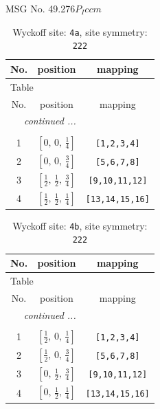 \documentclass[fleqn,8pt]{jsarticle}
\begin{document}
\setcounter{MaxMatrixCols}{32}

\renewcommand{\tablename}{Table~}
\renewcommand{\figurename}{Figure~}
\begin{center}
\LARGE
MSG No. 49.276\quad$P_{I}ccm$
\end{center}
\renewcommand{\arraystretch}{1.2}
\begin{longtable}{ccc}
\caption{Wyckoff site: {\tt 4a}, site symmetry: {\tt 222}}
 \\
 \hline \hline
No. & position & mapping \\ \hline \endfirsthead

\multicolumn{2}{l}{\tablename\ \thetable{}} \\
 \hline \hline
No. & position & mapping \\ \hline \endhead

 \hline \hline
\multicolumn{2}{r}{\footnotesize\it continued ...} \\ \endfoot

 \hline \hline
\multicolumn{2}{r}{} \\ \endlastfoot

1 & $\left[ 0,\, 0,\, \frac{1}{4} \right]$ & {\tt [1,2,3,4]} \\ \hline
2 & $\left[ 0,\, 0,\, \frac{3}{4} \right]$ & {\tt [5,6,7,8]} \\ \hline
3 & $\left[ \frac{1}{2},\, \frac{1}{2},\, \frac{3}{4} \right]$ & {\tt [9,10,11,12]} \\ \hline
4 & $\left[ \frac{1}{2},\, \frac{1}{2},\, \frac{1}{4} \right]$ & {\tt [13,14,15,16]} \\
\end{longtable}
\renewcommand{\arraystretch}{1.2}
\begin{longtable}{ccc}
\caption{Wyckoff site: {\tt 4b}, site symmetry: {\tt 222}}
 \\
 \hline \hline
No. & position & mapping \\ \hline \endfirsthead

\multicolumn{2}{l}{\tablename\ \thetable{}} \\
 \hline \hline
No. & position & mapping \\ \hline \endhead

 \hline \hline
\multicolumn{2}{r}{\footnotesize\it continued ...} \\ \endfoot

 \hline \hline
\multicolumn{2}{r}{} \\ \endlastfoot

1 & $\left[ \frac{1}{2},\, 0,\, \frac{1}{4} \right]$ & {\tt [1,2,3,4]} \\ \hline
2 & $\left[ \frac{1}{2},\, 0,\, \frac{3}{4} \right]$ & {\tt [5,6,7,8]} \\ \hline
3 & $\left[ 0,\, \frac{1}{2},\, \frac{3}{4} \right]$ & {\tt [9,10,11,12]} \\ \hline
4 & $\left[ 0,\, \frac{1}{2},\, \frac{1}{4} \right]$ & {\tt [13,14,15,16]} \\
\end{longtable}
\end{document}
